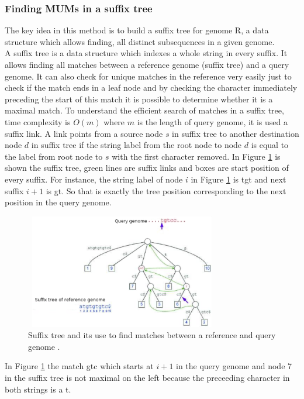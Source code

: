 \documentclass[3p,times]{elsarticle}
\begin{document}
\subsubsection{Finding MUMs in a suffix tree} 
The key idea in this method is to build a suffix tree for genome R, a data structure which allows finding, all distinct subsequences in a given genome.\\
A suffix tree is a data structure which indexes a whole string in every suffix. It allows finding all matches between a reference genome (suffix tree) and a query genome. It can also check for unique matches in the reference very easily just to check if the match ends in a leaf node and by checking the character immediately preceding the start of this match it is possible to determine whether it is a maximal match. To understand the efficient search of matches in a suffix tree, time complexity is $O(m)$ where $m$ is the length of query genome, it is used a suffix link. A link points from a source node $s$ in suffix tree to another destination node $d$ in suffix tree if the string label from the root node to node $d$ is equal to the label from root node to $s$ with the first character removed. In Figure \ref{fig:st} is shown the suffix tree, green lines are suffix links and boxes are start position of every suffix. For instance, the string label of node $i$ in Figure \ref{fig:st} is tgt and next suffix $i+1$ is gt. So that is exactly the tree position corresponding to the next position in the query genome.\\
\begin{figure}
  \centering
  \includegraphics[width=8.5cm,height=5cm]{st-mum.pdf}
  \caption{Suffix tree and its use to find matches between a reference and query genome \cite{Delcher2002}.}
\label{fig:st}
\end{figure}
In Figure \ref{fig:st} the match gtc which starts at $i+1$ in the query genome and node 7 in the suffix tree is not maximal on the left because the preceeding character in both strings is a t.\\
\end{document}
